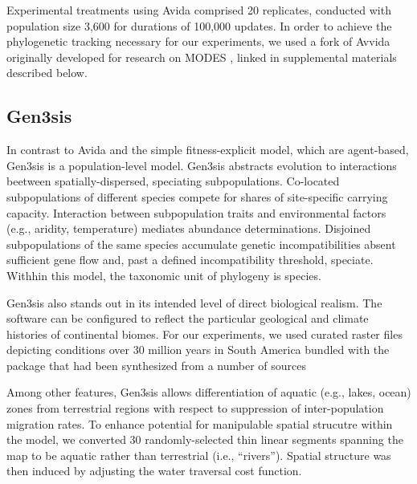 Experimental treatments using Avida comprised 20 replicates, conducted with population size 3,600 for durations of 100,000 updates.
In order to achieve the phylogenetic tracking necessary for our experiments, we used a fork of Avvida originally developed for research on MODES \citep{dolsonMODESToolboxMeasurements2019}, linked in supplemental materials described below.

\subsection{Gen3sis}

In contrast to Avida and the simple fitness-explicit model, which are agent-based, Gen3sis is a population-level model.
Gen3sis abstracts evolution to interactions beetween spatially-dispersed, speciating subpopulations.
Co-located subpopulations of different species compete for shares of site-specific carrying capacity.
Interaction between subpopulation traits and environmental factors (e.g., aridity, temperature) mediates abundance determinations.
Disjoined subpopulations of the same species accumulate genetic incompatibilities absent sufficient gene flow and, past a defined incompatibility threshold, speciate.
Withhin this model, the taxonomic unit of phylogeny is species.

Gen3sis also stands out in its intended level of direct biological realism.
The software can be configured to reflect the particular geological and climate histories of continental biomes.
For our experiments, we used curated raster files depicting conditions over 30 million years in South America bundled with the package that had been synthesized from a number of sources \citep{straume2020global,westerhold2020astronomically,fick2017worldclim,hagen2019mountain,annan2013new,cramwinckel2018synchronous,evans2018eocene,hollis2019deepmip,hutchinson2018climate,keating2011warm,sijp2014role,zhang2019evolution}

Among other features, Gen3sis allows differentiation of aquatic (e.g., lakes, ocean) zones from terrestrial regions with respect to suppression of inter-population migration rates.
To enhance potential for manipulable spatial strucutre within the model, we converted 30 randomly-selected thin linear segments spanning the map to be aquatic rather than terrestrial (i.e., ``rivers'').
Spatial structure was then induced by adjusting the water traversal cost function.

